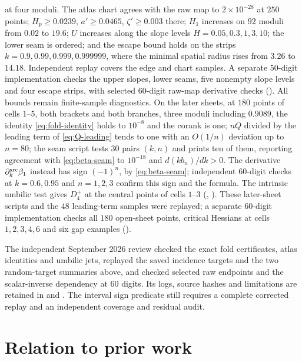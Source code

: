 \documentclass[11pt]{article}
\theoremstyle{remark}
\begin{document}
at four moduli.  The atlas chart agrees with the raw map to $2\times10^{-28}$ at
$250$ points; $H_p\ge0.0239$, $a'\ge0.0465$, $\zeta'\ge0.003$ there; $H_1$
increases on $92$ moduli from $0.02$ to $19.6$; $U$ increases along the
slope levels $H=0.05,0.3,1,3,10$; the lower seam is ordered; and the
escape bound holds on the strips $k=0.9,0.99,0.999,0.999999$, where the
minimal spatial radius rises from $3.26$ to $14.18$.
Independent replay covers the edge and chart samples.  A separate
$50$-digit implementation checks the upper slopes, lower seams, five
nonempty slope levels and four escape strips, with selected $60$-digit
raw-map derivative checks
().  All bounds remain
finite-sample diagnostics.  On the later sheets,
at $180$ points of cells $1$--$5$, both brackets and both branches, three
moduli including $0.9089$, the identity \eqref{eq:fold-identity} holds to
$10^{-8}$ and the corank is one; $nQ$ divided by the leading term of
\eqref{eq:Q-leading} tends to one with an $O(1/n)$ deviation up to
$n=80$; the seam script tests $30$ pairs $(k,n)$ and prints ten of them,
reporting agreement with \eqref{eq:beta-seam} to $10^{-18}$ and
$d(kb_n)/dk>0$.  The derivative $\partial_k^{\rm src}\beta_1$ instead
has sign $(-1)^n$, by \eqref{eq:beta-seam}; independent $60$-digit checks
at $k=0.6,0.95$ and $n=1,2,3$ confirm this sign and the formula.
The
intrinsic umbilic test gives $D_4^+$ at the central points of cells
$1$--$3$ (, ).
These later-sheet scripts and the $48$ leading-term samples were replayed;
a separate $60$-digit implementation checks all $180$ open-sheet points,
critical Hessians at cells $1,2,3,4,6$ and six gap examples
().

The independent September 2026 review checked the exact fold certificates,
atlas identities and umbilic jets, replayed the saved incidence targets
and the two random-target summaries above, and checked selected raw
endpoints and the scalar-inverse dependency at $60$ digits.  Its logs,
source hashes and limitations are retained in
 and
.
The interval sign predicate still requires a complete corrected replay
and an independent coverage and residual audit.

\section{Relation to prior work}
\end{document}
